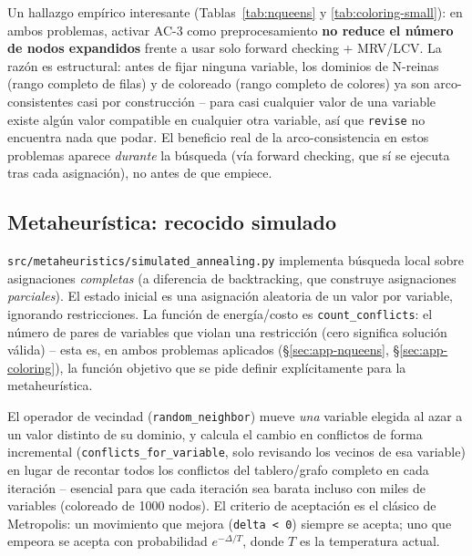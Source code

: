 \documentclass[11pt,onecolumn,letterpaper]{article}
\newcommand{\code}[1]{\texttt{#1}}
\begin{document}
Un hallazgo emp\'irico interesante (Tablas~\ref{tab:nqueens} y \ref{tab:coloring-small}):
en ambos problemas, activar AC-3 como preprocesamiento \textbf{no reduce el n\'umero de
nodos expandidos} frente a usar solo forward checking + MRV/LCV. La raz\'on es
estructural: antes de fijar ninguna variable, los dominios de N-reinas (rango completo de
filas) y de coloreado (rango completo de colores) ya son arco-consistentes casi por
construcci\'on -- para casi cualquier valor de una variable existe alg\'un valor compatible
en cualquier otra variable, as\'i que \code{revise} no encuentra nada que podar. El beneficio
real de la arco-consistencia en estos problemas aparece \emph{durante} la b\'usqueda (v\'ia
forward checking, que s\'i se ejecuta tras cada asignaci\'on), no antes de que empiece.

\subsection{Metaheur\'istica: recocido simulado}
\label{sec:impl-sa}

\code{src/metaheuristics/simulated\_annealing.py} implementa b\'usqueda local sobre
asignaciones \emph{completas} (a diferencia de backtracking, que construye asignaciones
\emph{parciales}). El estado inicial es una asignaci\'on aleatoria de un valor por
variable, ignorando restricciones. La funci\'on de energ\'ia/costo es
\code{count\_conflicts}: el n\'umero de pares de variables que violan una restricci\'on
(cero significa soluci\'on v\'alida) -- esta es, en ambos problemas aplicados
(\S\ref{sec:app-nqueens}, \S\ref{sec:app-coloring}), la funci\'on objetivo que se pide
definir expl\'icitamente para la metaheur\'istica.

El operador de vecindad (\code{random\_neighbor}) mueve \emph{una} variable elegida al azar
a un valor distinto de su dominio, y calcula el cambio en conflictos de forma incremental
(\code{conflicts\_for\_variable}, solo revisando los vecinos de esa variable) en lugar de
recontar todos los conflictos del tablero/grafo completo en cada iteraci\'on -- esencial
para que cada iteraci\'on sea barata incluso con miles de variables (coloreado de 1000
nodos). El criterio de aceptaci\'on es el cl\'asico de Metropolis: un movimiento que mejora
(\code{delta < 0}) siempre se acepta; uno que empeora se acepta con probabilidad
$e^{-\Delta/T}$, donde $T$ es la temperatura actual.
\end{document}
